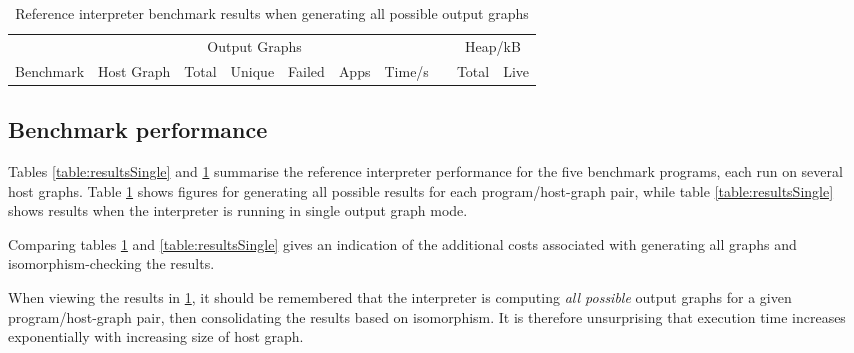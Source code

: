 \begin{table}[h]
\begin{minipage}{\textwidth}
\centering

\begin{tabular}{llrrrrrcrr}
\hline 
&  & \multicolumn{3}{c}{Output Graphs} & & && \multicolumn{2}{c}{Heap/kB}\\
Benchmark          & Host Graph\footnotemark & Total & Unique   & Failed & Apps & Time/s   & & Total  & Live \\
\hline 

\end{tabular}

\caption[Reference interpreter benchmarks]{Reference interpreter benchmark results when generating all possible output graphs}

\label{table:resultsAll}
\end{minipage}
\end{table}


\subsection{Benchmark performance}

Tables \ref{table:resultsSingle} and \ref{table:resultsAll} summarise the reference interpreter performance for the five benchmark programs, each run on several host graphs. Table \ref{table:resultsAll} shows figures for generating all possible results for each program/host-graph pair, while table \ref{table:resultsSingle} shows results when the interpreter is running in single output graph mode.

Comparing tables \ref{table:resultsAll} and \ref{table:resultsSingle} gives an indication of the additional costs associated with generating all graphs and isomorphism-checking the results.




When viewing the results in \ref{table:resultsAll}, it should be remembered that the interpreter is computing \textit{all possible} output graphs for a given program/host-graph pair, then consolidating the results based on isomorphism. It is therefore unsurprising that execution time increases exponentially with increasing size of host graph.


